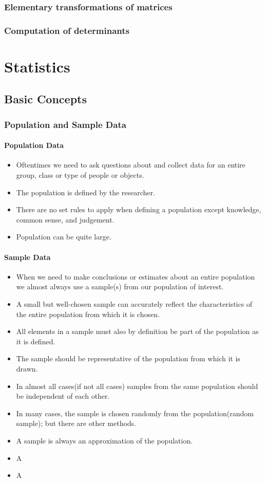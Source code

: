 \documentclass[13pt]{book}
\begin{document}
\section{Elementary transformations of matrices}
\section{Computation of determinants}
\part{Statistics}
\chapter{Basic Concepts}
\section{Population and Sample Data}
\subsection{Population Data}
\begin{itemize}
  \item Oftentimes we need to ask questions about and collect data for an entire group, class or type of people or objects.
  \item The population is defined by the researcher.
  \item There are no set rules to apply when defining a population except knowledge, common sense, and judgement.
  \item Population can be quite large.
\end{itemize}
\subsection{Sample Data}
\begin{itemize}
  \item When we need to make conclusions or estimates about an entire population we almost always use a sample(s) from our population of interest.
  \item A small but well-chosen sample can accurately reflect the characteristics of the entire population from which it is chosen.
  \item All elements in a sample must also by definition be part of the population as it is defined.
  \item The sample should be representative of the population from which it is drawn.
  \item In almost all cases(if not all cases) samples from the same population should be independent of each other.
  \item In many cases, the sample is chosen randomly from the population(random sample); but there are other methods.
  \item A sample is always an approximation of the population.
\end{itemize}

\begin{itemize}
  \item A
\end{itemize}

\begin{itemize}
  \item A
\end{itemize}
\end{document}
